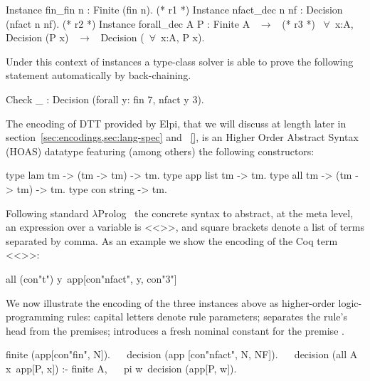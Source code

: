 \documentclass[sigconf,natbib=false,review]{acmart}
\begin{document}
\begin{coqcode}
Instance fin_fin n : Finite (fin n).              (* r1 *)
Instance nfact_dec n nf : Decision (nfact n nf).  (* r2 *)
Instance forall_dec A P : Finite A ~$\to$~             (* r3 *)
  ~$\forall$~x:A, Decision (P x) ~$\to$~ Decision (~$\forall$~x:A, P x).
\end{coqcode}

\noindent Under this context of instances a type-class solver is able to prove
the following statement automatically by back-chaining.

\begin{coqcode}
  Check _ : Decision (forall y: fin 7, nfact y 3).       ~~
\end{coqcode}

\noindent
The encoding of DTT provided by Elpi, that we will discuss at length later in
section~\ref{sec:encodings,sec:lang-spec} and ~\ref{}, is an Higher Order Abstract
Syntax (HOAS) datatype  featuring (among others) the following
constructors:

\begin{elpicode}
type lam  tm -> (tm -> tm) -> tm.     %
type app  list tm -> tm.              %
type all  tm -> (tm -> tm) -> tm.     %
type con  string -> tm.               %
\end{elpicode}

\noindent
Following standard $\lambda$Prolog~\cite{miller_nadathur_2012}
the concrete syntax to abstract, at the meta level, an expression
 over a variable 
is <<>>, and square brackets denote a list of
terms separated by comma. As an example we show the encoding of the Coq term
<<>>:

\begin{elpicode}
all (con"t") y\ app[con"nfact", y, con"3"]
\end{elpicode}

\noindent
We now illustrate the encoding of the three instances above as higher-order
logic-programming rules: capital letters denote rule
parameters; \elpiIn{:-} separates the rule's head from the premises;
 introduces a fresh nominal constant 
for the premise .

\begin{elpicode}
finite (app[con"fin", N]).                            ~~
decision (app [con"nfact", N, NF]).                   ~~
decision (all A x\ app[P, x]) :- finite A,            ~~
  pi w\ decision (app[P, w]).
\end{elpicode}
\end{document}
